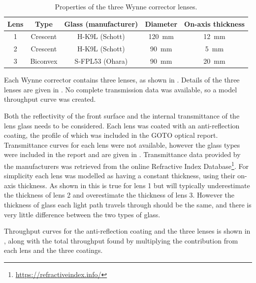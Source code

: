\begin{colsection}
\begin{colsection}
\begin{table}[t]
    \begin{center}
        \begin{tabular}{c|cccc} %
            Lens & Type     & Glass (manufacturer) & Diameter               & On-axis thickness \\
            \midrule
               1 & Crescent &    H-K9L (Schott)    & \SI{120}{\milli\meter} & \SI{12}{\milli\meter} \\
               2 & Crescent &    H-K9L (Schott)    & \SI{90}{\milli\meter}  & \SI{5}{\milli\meter} \\
               3 & Biconvex &  S-FPL53 (Ohara)     & \SI{90}{\milli\meter}  & \SI{20}{\milli\meter} \\
        \end{tabular}
    \end{center}
    \caption[Wynne corrector lens properties]{
        Properties of the three Wynne corrector lenses.
    }\label{tab:lenses}
\end{table}

Each Wynne corrector contains three lenses, as shown in . Details of the three lenses are given in . No complete transmission data was available, so a model throughput curve was created.

Both the reflectivity of the front surface and the internal transmittance of the lens glass needs to be considered. Each lens was coated with an anti-reflection coating, the profile of which was included in the GOTO optical report. Transmittance curves for each lens were not available, however the glass types were included in the report and are given in . Transmittance data provided by the manufacturers was retrieved from the online Refractive Index Database\footnote{\url{https://refractiveindex.info/}}. For simplicity each lens was modelled as having a constant thickness, using their on-axis thickness. As shown in  this is true for lens 1 but will typically underestimate the thickness of lens 2 and overestimate the thickness of lens 3. However the thickness of glass each light path travels through should be the same, and there is very little difference between the two types of glass.

Throughput curves for the anti-reflection coating and the three lenses is shown in , along with the total throughput found by multiplying the contribution from each lens and the three coatings.


\end{colsection}
\end{colsection}
